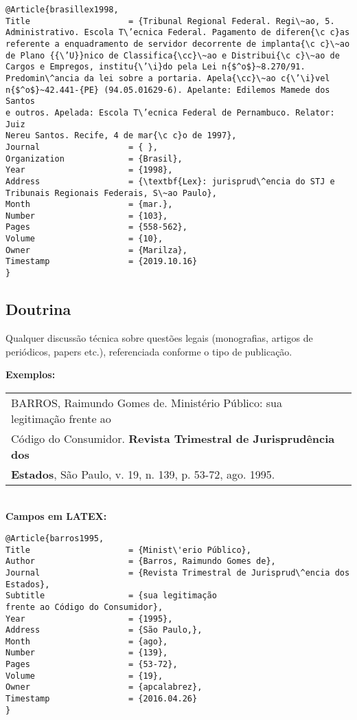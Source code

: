 \begin{verbatim}
@Article{brasillex1998,
Title                    = {Tribunal Regional Federal. Regi\~ao, 5. 
Administrativo. Escola T\’ecnica Federal. Pagamento de diferen{\c c}as 
referente a enquadramento de servidor decorrente de implanta{\c c}\~ao 
de Plano {{\’U}}nico de Classifica{\cc}\~ao e Distribui{\c c}\~ao de 
Cargos e Empregos, institu{\’\i}do pela Lei n{$^o$}~8.270/91. 
Predomin\^ancia da lei sobre a portaria. Apela{\cc}\~ao c{\’\i}vel
n{$^o$}~42.441-{PE} (94.05.01629-6). Apelante: Edilemos Mamede dos Santos
e outros. Apelada: Escola T\’ecnica Federal de Pernambuco. Relator: Juiz
Nereu Santos. Recife, 4 de mar{\c c}o de 1997},
Journal                  = { },
Organization             = {Brasil},
Year                     = {1998},
Address                  = {\textbf{Lex}: jurisprud\^encia do STJ e 
Tribunais Regionais Federais, S\~ao Paulo},
Month                    = {mar.},
Number                   = {103},
Pages                    = {558-562},
Volume                   = {10},
Owner                    = {Marilza},
Timestamp                = {2019.10.16}
}
\end{verbatim}

\subsection{Doutrina}

Qualquer discussão t\'ecnica sobre questões legais (monografias, artigos
de periódicos, papers etc.), referenciada conforme o tipo de publicação. 

\textbf{Exemplos:} \\

\begin{tabular}{|l|c|} \hline
	BARROS, Raimundo Gomes de. Minist\'erio Público: sua legitimação	frente ao\\
	Código do Consumidor. \textbf{Revista Trimestral de Jurisprud\^encia dos}\\
	\textbf{Estados}, São Paulo, v. 19, n. 139, p. 53-72, ago. 1995. \\\hline
\end{tabular} \\

\textbf{Campos em LATEX:} 

\begin{verbatim}
@Article{barros1995,
Title                    = {Minist\'erio Público},
Author                   = {Barros, Raimundo Gomes de},
Journal                  = {Revista Trimestral de Jurisprud\^encia dos 
Estados},
Subtitle                 = {sua legitimação
frente ao Código do Consumidor},
Year                     = {1995},
Address                  = {São Paulo,},
Month                    = {ago},
Number                   = {139},
Pages                    = {53-72},
Volume                   = {19},
Owner                    = {apcalabrez},
Timestamp                = {2016.04.26}
}
\end{verbatim}

